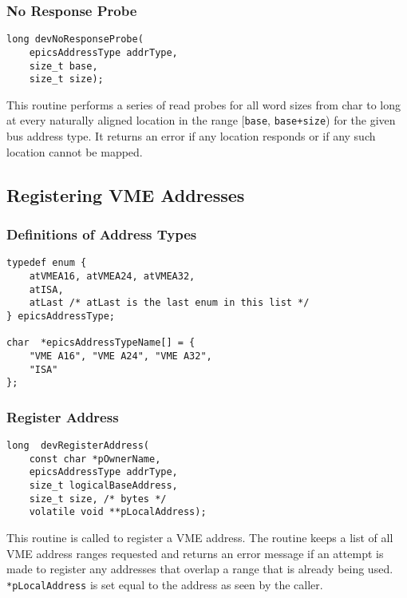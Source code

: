 \subsubsection{No Response Probe}

\begin{verbatim}
long devNoResponseProbe(
    epicsAddressType addrType,
    size_t base,
    size_t size);
\end{verbatim}

This routine performs a series of read probes for all word sizes from char to long at every naturally aligned location in the 
range [\verb|base|, \verb|base+size|) for the given bus address type. It returns an error if any location responds or if any such 
location cannot be mapped.

\subsection{Registering VME Addresses}

\subsubsection{Definitions of Address Types}

\begin{verbatim}
typedef enum {
    atVMEA16, atVMEA24, atVMEA32,
    atISA,
    atLast /* atLast is the last enum in this list */
} epicsAddressType;

char  *epicsAddressTypeName[] = {
    "VME A16", "VME A24", "VME A32",
    "ISA"
};
\end{verbatim}

\subsubsection{Register Address}

\begin{verbatim}
long  devRegisterAddress(
    const char *pOwnerName,
    epicsAddressType addrType,
    size_t logicalBaseAddress,
    size_t size, /* bytes */
    volatile void **pLocalAddress);
\end{verbatim}

This routine is called to register a VME address. The routine keeps a list of all VME address ranges requested and returns 
an error message if an attempt is made to register any addresses that overlap a range that is already being used. 
\verb|*pLocalAddress| is set equal to the address as seen by the caller.

